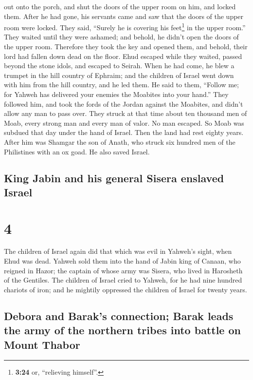 out onto the porch, and shut the doors of the upper room on him, and
locked them.  After he had gone, his servants came and
saw that the doors of the upper room were locked. They said, ``Surely he
is covering his feet\footnote{\textbf{3:24} or, ``relieving himself''.}
in the upper room.''  They waited until they were
ashamed; and behold, he didn't open the doors of the upper room.
Therefore they took the key and opened them, and behold, their lord had
fallen down dead on the floor.  Ehud escaped while they
waited, passed beyond the stone idols, and escaped to Seirah.
 When he had come, he blew a trumpet in the hill country
of Ephraim; and the children of Israel went down with him from the hill
country, and he led them.  He said to them, ``Follow me;
for Yahweh has delivered your enemies the Moabites into your hand.''
They followed him, and took the fords of the Jordan against the
Moabites, and didn't allow any man to pass over.  They
struck at that time about ten thousand men of Moab, every strong man and
every man of valor. No man escaped.  So Moab was subdued
that day under the hand of Israel. Then the land had rest eighty years.
 After him was Shamgar the son of Anath, who struck six
hundred men of the Philistines with an ox goad. He also saved Israel.

\hypertarget{king-jabin-and-his-general-sisera-enslaved-israel}{%
\subsection{King Jabin and his general Sisera enslaved
Israel}\label{king-jabin-and-his-general-sisera-enslaved-israel}}

\hypertarget{section-3}{%
\section{4}\label{section-3}}

 The children of Israel again did that which was evil in
Yahweh's sight, when Ehud was dead.  Yahweh sold them into
the hand of Jabin king of Canaan, who reigned in Hazor; the captain of
whose army was Sisera, who lived in Harosheth of the Gentiles.
 The children of Israel cried to Yahweh, for he had nine
hundred chariots of iron; and he mightily oppressed the children of
Israel for twenty years.

\hypertarget{debora-and-baraks-connection-barak-leads-the-army-of-the-northern-tribes-into-battle-on-mount-thabor}{%
\subsection{Debora and Barak's connection; Barak leads the army of the
northern tribes into battle on Mount
Thabor}\label{debora-and-baraks-connection-barak-leads-the-army-of-the-northern-tribes-into-battle-on-mount-thabor}}

